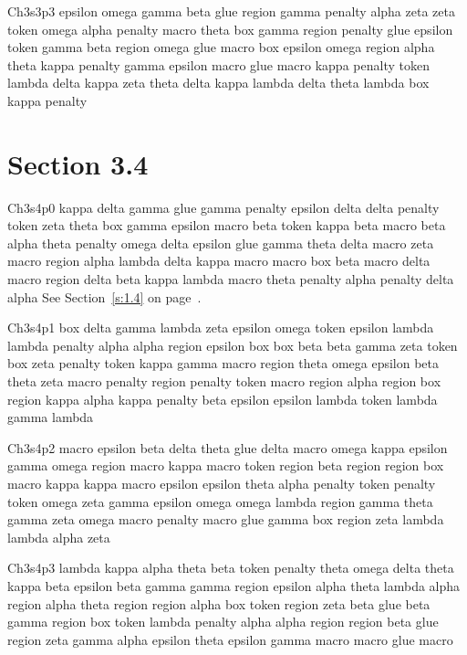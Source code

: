 Ch3s3p3 epsilon omega gamma beta glue region gamma penalty alpha zeta zeta token omega alpha penalty macro theta box gamma region penalty glue epsilon token gamma beta region omega glue macro box epsilon omega region alpha theta kappa penalty gamma epsilon macro glue macro kappa penalty token lambda delta kappa zeta theta delta kappa lambda delta theta lambda box kappa penalty

\section{Section 3.4}\label{s:3.4}
Ch3s4p0 kappa delta gamma glue gamma penalty epsilon delta delta penalty token zeta theta box gamma epsilon macro beta token kappa beta macro beta alpha theta penalty omega delta epsilon glue gamma theta delta macro zeta macro region alpha lambda delta kappa macro macro box beta macro delta macro region delta beta kappa lambda macro theta penalty alpha penalty delta alpha See Section~\ref{s:1.4} on page~\pageref{s:1.4}.

Ch3s4p1 box delta gamma lambda zeta epsilon omega token epsilon lambda lambda penalty alpha alpha region epsilon box box beta beta gamma zeta token box zeta penalty token kappa gamma macro region theta omega epsilon beta theta zeta macro penalty region penalty token macro region alpha region box region kappa alpha kappa penalty beta epsilon epsilon lambda token lambda gamma lambda

Ch3s4p2 macro epsilon beta delta theta glue delta macro omega kappa epsilon gamma omega region macro kappa macro token region beta region region box macro kappa kappa macro epsilon epsilon theta alpha penalty token penalty token omega zeta gamma epsilon omega omega lambda region gamma theta gamma zeta omega macro penalty macro glue gamma box region zeta lambda lambda alpha zeta

Ch3s4p3 lambda kappa alpha theta beta token penalty theta omega delta theta kappa beta epsilon beta gamma gamma region epsilon alpha theta lambda alpha region alpha theta region region alpha box token region zeta beta glue beta gamma region box token lambda penalty alpha alpha region region beta glue region zeta gamma alpha epsilon theta epsilon gamma macro macro glue macro

